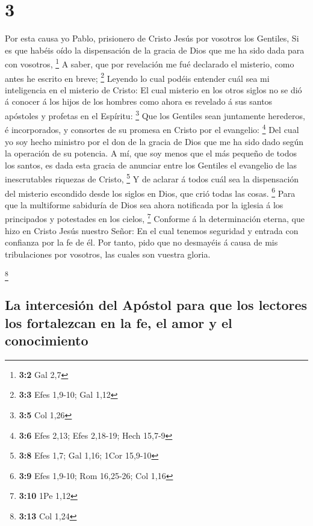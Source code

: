 \hypertarget{section-2}{%
\section{3}\label{section-2}}

 Por esta causa yo Pablo, prisionero de Cristo Jesús por
vosotros los Gentiles,  Si es que habéis oído la
dispensación de la gracia de Dios que me ha sido dada para con vosotros,
\footnote{\textbf{3:2} Gal 2,7}  A saber, que por
revelación me fué declarado el misterio, como antes he escrito en breve;
\footnote{\textbf{3:3} Efes 1,9-10; Gal 1,12}  Leyendo lo
cual podéis entender cuál sea mi inteligencia en el misterio de Cristo:
 El cual misterio en los otros siglos no se dió á conocer
á los hijos de los hombres como ahora es revelado á sus santos apóstoles
y profetas en el Espíritu: \footnote{\textbf{3:5} Col 1,26}
 Que los Gentiles sean juntamente herederos, é
incorporados, y consortes de su promesa en Cristo por el evangelio:
\footnote{\textbf{3:6} Efes 2,13; Efes 2,18-19; Hech 15,7-9}
 Del cual yo soy hecho ministro por el don de la gracia de
Dios que me ha sido dado según la operación de su potencia.
 A mí, que soy menos que el más pequeño de todos los
santos, es dada esta gracia de anunciar entre los Gentiles el evangelio
de las inescrutables riquezas de Cristo, \footnote{\textbf{3:8} Efes
  1,7; Gal 1,16; 1Cor 15,9-10}  Y de aclarar á todos cuál
sea la dispensación del misterio escondido desde los siglos en Dios, que
crió todas las cosas. \footnote{\textbf{3:9} Efes 1,9-10; Rom 16,25-26;
  Col 1,16}  Para que la multiforme sabiduría de Dios sea
ahora notificada por la iglesia á los principados y potestades en los
cielos, \footnote{\textbf{3:10} 1Pe 1,12}  Conforme á la
determinación eterna, que hizo en Cristo Jesús nuestro Señor:
 En el cual tenemos seguridad y entrada con confianza por
la fe de él.  Por tanto, pido que no desmayéis á causa de
mis tribulaciones por vosotros, las cuales son vuestra gloria.

\footnote{\textbf{3:13} Col 1,24}

\hypertarget{la-intercesiuxf3n-del-apuxf3stol-para-que-los-lectores-los-fortalezcan-en-la-fe-el-amor-y-el-conocimiento}{%
\subsection{La intercesión del Apóstol para que los lectores los
fortalezcan en la fe, el amor y el
conocimiento}\label{la-intercesiuxf3n-del-apuxf3stol-para-que-los-lectores-los-fortalezcan-en-la-fe-el-amor-y-el-conocimiento}}

